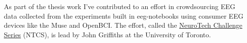     As part of the thesis work I've contributed to an effort in crowdsourcing EEG data collected from the experiments built in eeg-notebooks using consumer EEG devices like the Muse and OpenBCI\@. The effort, called the \href{https://neurotech-challenge.com/}{NeuroTech Challenge Series} (NTCS), is lead by John Griffiths at the University of Toronto.


